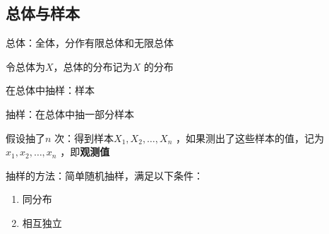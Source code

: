 \subsection{总体与样本}%
\label{sub:总体与样本}
\begin{defi}
    总体：全体，分作有限总体和无限总体
\end{defi}
令总体为$X$，总体的分布记为$X$ 的分布

在总体中抽样：样本
\begin{defi}
    抽样：在总体中抽一部分样本
\end{defi}
假设抽了$n$ 次：得到样本$X_1,X_2,\ldots ,X_{n}$ ，如果测出了这些样本的值，记为$x_1,x_2,\ldots ,x_{n}$ ，即\textbf{观测值}
\begin{notation}
    抽样的方法：简单随机抽样，满足以下条件：
    \begin{enumerate}
        \item 同分布
        \item 相互独立
    \end{enumerate}
\end{notation}

